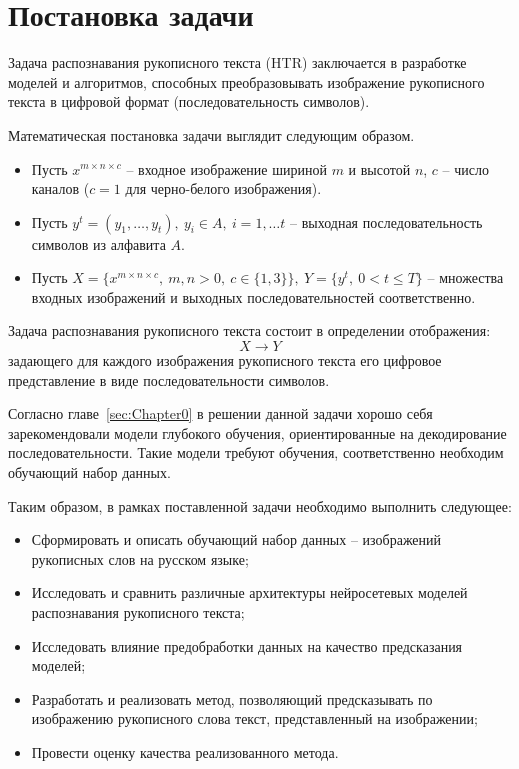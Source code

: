 \section{Постановка задачи}
\label{sec:Chapter1} 

Задача распознавания рукописного текста (HTR) заключается в разработке моделей и алгоритмов,
способных преобразовывать изображение рукописного текста в цифровой формат (последовательность символов).

Математическая постановка задачи выглядит следующим образом.

\begin{itemize}
    \item[] Пусть $x^{m \times n \times c}$ -- входное изображение шириной $m$ и высотой $n$, $c$ -- число каналов ($c=1$ для черно-белого изображения).
    \item[] Пусть $y^t=(y_1,\dots,y_t),~y_i \in A,~i=1,\dots t$ -- выходная последовательность символов из алфавита $A$.
    \item[] Пусть $X=\{x^{m \times n \times c},~m,n>0,~c\in\{1,3\}\},~Y=\{y^t,~0<t\leqslant T\}$ -- множества входных изображений и выходных последовательностей соответственно.

\end{itemize}

Задача распознавания рукописного текста состоит в определении отображения:
\[ X \rightarrow Y \]
задающего для каждого изображения рукописного текста его цифровое представление в виде последовательности символов.

Согласно главе~\ref{sec:Chapter0} в решении данной задачи хорошо себя зарекомендовали модели глубокого обучения,
ориентированные на декодирование последовательности.
Такие модели требуют обучения, соответственно необходим обучающий набор данных.

Таким образом, в рамках поставленной задачи необходимо выполнить следующее:
\begin{itemize}
    \item Сформировать и описать обучающий набор данных -- изображений рукописных слов на русском языке;
    \item Исследовать и сравнить различные архитектуры нейросетевых моделей распознавания рукописного текста;
    \item Исследовать влияние предобработки данных на качество предсказания моделей;
    \item Разработать и реализовать метод, позволяющий предсказывать по изображению рукописного слова текст, представленный на изображении;
    \item Провести оценку качества реализованного метода.
\end{itemize}